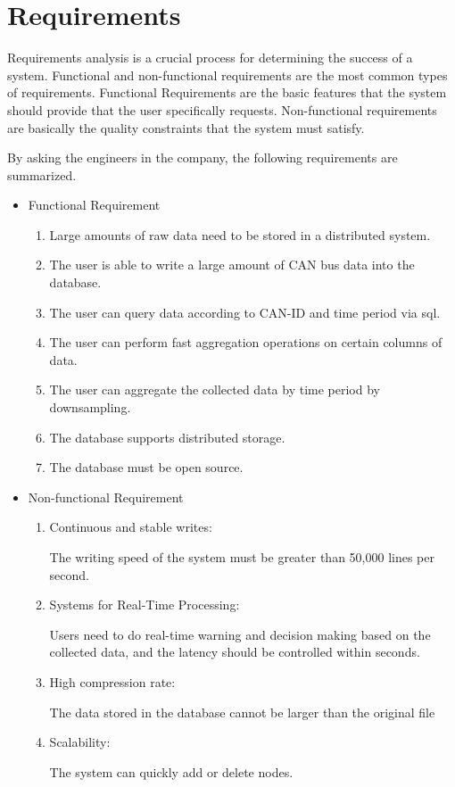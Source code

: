 \section{Requirements}
Requirements analysis is a crucial process for determining the success of a system. Functional and non-functional requirements are the most common types of requirements. Functional Requirements are the basic features that the system should provide that the user specifically requests. Non-functional requirements are basically the quality constraints that the system must satisfy\cite{geeksforgeeks_2020}. 

By asking the engineers in the company, the following requirements are summarized.

\begin{itemize}
    \item Functional Requirement
    
    \begin{enumerate}
        \item Large amounts of raw data need to be stored in a distributed system.
        \item The user is able to write a large amount of CAN bus data into the database.
        \item The user can query data according to CAN-ID and time period via \ac{sql}.
        \item The user can perform fast aggregation operations on certain columns of data.
        \item The user can aggregate the collected data by time period by downsampling.
        \item The database supports distributed storage.
        \item The database must be open source.
    \end{enumerate}
    
    \item Non-functional Requirement
\begin{enumerate}
    \item Continuous and stable writes: 
    
    The writing speed of the system must be greater than 50,000 lines per second.
    \item Systems for Real-Time Processing:
    
    Users need to do real-time warning and decision making based on the collected data, and the latency should be controlled within seconds.
    \item High compression rate:
    
    The data stored in the database cannot be larger than the original file
    \item Scalability:
    
    The system can quickly add or delete nodes.
\end{enumerate}
\end{itemize}


